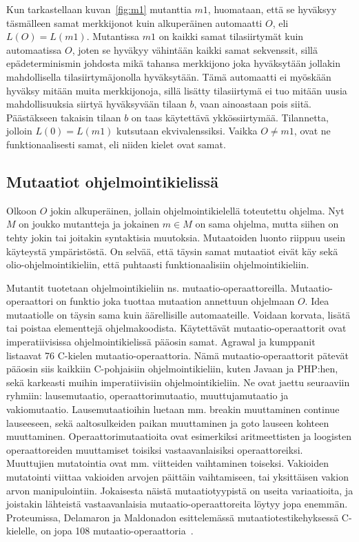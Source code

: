 \documentclass{tktltiki}
\begin{document}
Kun tarkastellaan kuvan~\ref{fig:m1} mutanttia $m1$, huomataan, että se hyväksyy täsmälleen samat merkkijonot kuin alkuperäinen automaatti $O$, eli $L(O) = L(m1)$. Mutantissa $m1$ on kaikki samat tilasiirtymät kuin automaatissa $O$, joten se hyväkyy vähintään kaikki samat sekvenssit, sillä epädeterminismin johdosta mikä tahansa merkkijono joka hyväksytään jollakin mahdollisella tilasiirtymäjonolla hyväksytään. Tämä automaatti ei myöskään hyväksy mitään muita merkkijonoja, sillä lisätty tilasiirtymä ei tuo mitään uusia mahdollisuuksia siirtyä hyväksyvään tilaan $b$, vaan ainoastaan pois siitä. Päästäkseen takaisin tilaan $b$ on taas käytettävä ykkössiirtymää. Tilannetta, jolloin $L(0) = L(m1)$ kutsutaan ekvivalenssiksi. Vaikka $O \neq m1$, ovat ne funktionaalisesti samat, eli niiden kielet ovat samat.
 
\subsection{Mutaatiot ohjelmointikielissä}
Olkoon $O$ jokin alkuperäinen, jollain ohjelmointikielellä toteutettu ohjelma. Nyt $M$ on joukko mutantteja ja jokainen $m\in M$ on sama ohjelma, mutta siihen on tehty jokin tai joitakin syntaktisia muutoksia. Mutaatoiden luonto riippuu usein käyteystä ympäristöstä. On selvää, että täysin samat mutaatiot eivät käy sekä olio-ohjelmointikieliin, että puhtaasti funktionaalisiin ohjelmointikieliin.

Mutantit tuotetaan ohjelmointikieliin ns. mutaatio-operaattoreilla. Mutaatio-operaattori on funktio joka tuottaa mutaation annettuun ohjelmaan $O$. Idea mutaatiolle on täysin sama kuin äärellisille automaateille. Voidaan korvata, lisätä tai poistaa elementtejä ohjelmakoodista. Käytettävät mutaatio-operaattorit ovat imperatiivisissa ohjelmointikielissä pääosin samat. Agrawal ja kumppanit listaavat 76 C-kielen mutaatio-operaattoria. Nämä mutaatio-operaattorit pätevät pääosin siis kaikkiin C-pohjaisiin ohjelmointikieliin, kuten Javaan ja PHP:hen, sekä karkeasti muihin imperatiivisiin ohjelmointikieliin. Ne ovat jaettu seuraaviin ryhmiin: lausemutaatio, operaattorimutaatio, muuttujamutaatio ja vakiomutaatio. Lausemutaatioihin luetaan mm. breakin muuttaminen continue lauseeseen, sekä aaltosulkeiden paikan muuttaminen ja goto lauseen kohteen muuttaminen. Operaattorimutaatioita ovat esimerkiksi aritmeettisten ja loogisten operaattoreiden muuttamiset toisiksi vastaavanlaisiksi operaattoreiksi. Muuttujien mutatointia ovat mm. viitteiden vaihtaminen toiseksi. Vakioiden mutatointi viittaa vakioiden arvojen päittäin vaihtamiseen, tai yksittäisen vakion arvon manipulointiin. Jokaisesta näistä mutaatiotyypistä on useita variaatioita, ja joistakin lähteistä vastaavanlaisia mutaatio-operaattoreita löytyy jopa enemmän. Proteumissa, Delamaron ja Maldonadon esittelemässä mutaatiotestikehyksessä C-kielelle, on jopa 108 mutaatio-operaattoria~\cite{}. 
\end{document}
